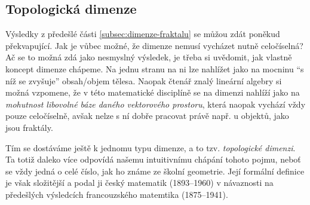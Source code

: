 \subsection{Topologická dimenze}\label{subsec:topologicka-dimenze}

Výsledky z předešlé části \ref{subsec:dimenze-fraktalu} se můžou zdát poněkud překvapující. Jak je vůbec možné, že dimenze nemusí vycházet nutně celočíselná? Ač se to možná zdá jako nesmyslný výsledek, je třeba si uvědomit, jak vlastně koncept dimenze chápeme. Na jednu stranu na ni lze nahlížet jako na mocninu ``s níž se zvyšuje'' obsah/objem tělesa. Naopak čtenář znalý lineární algebry si možná vzpomene, že v této matematické disciplíně se na dimenzi nahlíží jako na \emph{mohutnost libovolné báze daného vektorového prostoru}, která naopak vychází vždy pouze celočíselně, avšak nelze s ní dobře pracovat právě např. u objektů, jako jsou fraktály. 

Tím se dostáváme ještě k jednomu typu dimenze, a to tzv. \emph{topologické dimenzi}. Ta totiž daleko více odpovídá našemu intuitivnímu chápání tohoto pojmu, neboť se vždy jedná o celé číslo, jak ho známe ze školní geometrie. Její formální definice je však složitější a podal ji český matematik  (1893--1960) v návaznosti na předešlých výsledcích francouzského matemtika  (1875--1941).